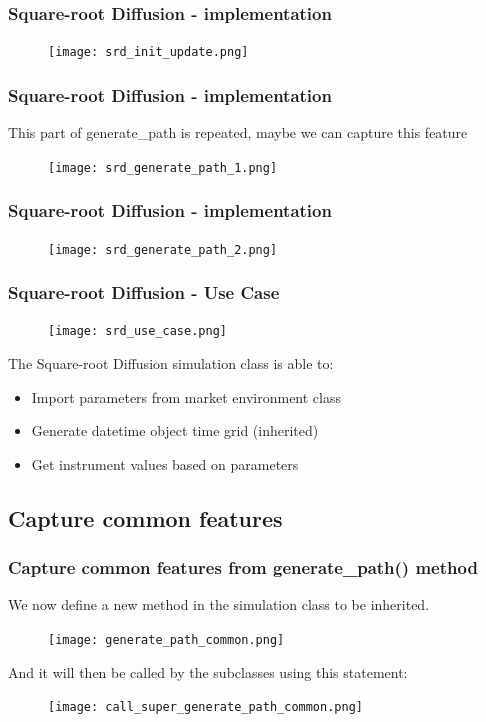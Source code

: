 \documentclass{beamer}
\begin{document}
\begin{frame}
\frametitle{Square-root Diffusion - implementation}
\begin{figure}[H]
	\texttt{[image: srd\_init\_update.png]}
\end{figure}
\end{frame}

\begin{frame}
\frametitle{Square-root Diffusion - implementation}
This part of generate\_path is repeated, maybe we can capture this feature
\begin{figure}[H]
	\texttt{[image: srd\_generate\_path\_1.png]}
\end{figure}
\end{frame}

\begin{frame}
\frametitle{Square-root Diffusion - implementation}
\begin{figure}[H]
	\texttt{[image: srd\_generate\_path\_2.png]}
\end{figure}
\end{frame}

\begin{frame}
\frametitle{Square-root Diffusion - Use Case}
\begin{figure}[H]
	\texttt{[image: srd\_use\_case.png]}
\end{figure}
The Square-root Diffusion simulation class is able to:
\begin{itemize}
	\item Import parameters from market environment class
	\item Generate datetime object time grid (inherited)
	\item Get instrument values based on parameters
\end{itemize}
\end{frame}

\subsection{Capture common features}
\begin{frame}
\frametitle{Capture common features from generate\_path() method}
We now define a new method in the simulation class to be inherited.
\begin{figure}[H]
	\texttt{[image: generate\_path\_common.png]}
\end{figure}
And it will then be called by the subclasses using this statement:
\begin{figure}[H]
	\texttt{[image: call\_super\_generate\_path\_common.png]}
\end{figure}
\end{frame}
\end{document}
